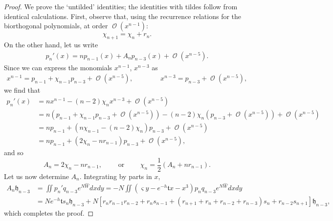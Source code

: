 \documentclass[usenames,dvipsnames]{article}
\theoremstyle{definition}
\DeclareMathOperator{\OO}{\mathcal{O}}
\numberwithin{equation}{section}
\numberwithin{figure}{section}
\begin{document}
    \begin{proof}
        We prove the `untilded' identities; the identities with tildes follow from identical calculations. First, observe that, using the recurrence relations for the biorthogonal polynomials, at order $\OO(x^{n-1})$:
            \begin{equation*}
                \chi_{n+1} = \chi_n + r_n.
            \end{equation*}
        On the other hand, let us write
            \begin{align*}
                p_n'(x) = np_{n-1}(x) + A_np_{n-3}(x) + \OO(x^{n-5}).
            \end{align*}
        Since we can express the monomials $x^{n-1}$, $x^{n-3}$ as
            \begin{align*}
                x^{n-1} = p_{n-1}+\chi_{n-1} p_{n-3}+ \OO(x^{n-5}), \qquad \qquad x^{n-3}= p_{n-3}+\OO(x^{n-5}),
            \end{align*}
        we find that
            \begin{align*}
                p_n'(x) &= nx^{n-1} -(n-2)\chi_nx^{n-3} + \OO(x^{n-5})\\
                        &= n\left(p_{n-1}+\chi_{n-1}p_{n-3} + \OO(x^{n-5})\right) - (n-2)\chi_{n}\left(p_{n-3}+\OO(x^{n-5})\right) + \OO(x^{n-5})\\
                        &= n p_{n-1} + \left(n\chi_{n-1}-(n-2)\chi_n\right)p_{n-3} + \OO(x^{n-5})\\
                        &= n p_{n-1} + \left(2\chi_{n}-nr_{n-1}\right)p_{n-3} + \OO(x^{n-5}),
            \end{align*}
        and so
            \begin{equation*}
                A_n = 2\chi_{n}-nr_{n-1},\qquad \text{ or } \qquad \chi_n = \frac{1}{2}\left(A_n + nr_{n-1}\right).
            \end{equation*}
            Let us now determine $A_n$. Integrating by parts in $x$,
        \begin{align*}
            A_n\mathfrak{h}_{n-3} &= \iint p_n'q_{n-3}e^{N\hat{W}}dxdy = -N\iint (\varsigma y-e^{-h}\mathfrak{t}x-x^3)p_nq_{n-3}e^{N\hat{W}}dxdy\\
                       &= Ne^{-h}\mathfrak{t}s_n\mathfrak{h}_{n-3}+N[r_nr_{n-1}r_{n-2} +r_ns_{n-1} + (r_{n+1}+r_{n}+r_{n-2}+r_{n-3})s_n + r_{n-2}s_{n+1}]\mathfrak{h}_{n-3},
        \end{align*}
        which completes the proof.
    \end{proof}
\end{document}
